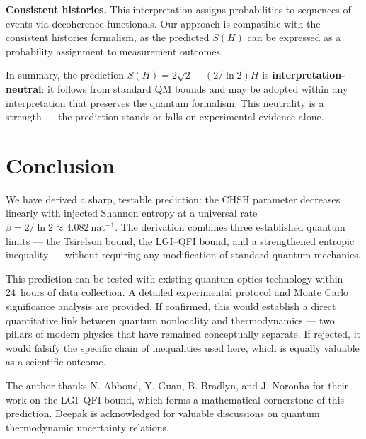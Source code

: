 \documentclass[a4paper]{quantumarticle}
\begin{document}
\textbf{Consistent histories.} This interpretation assigns probabilities to sequences of events via decoherence functionals. Our approach is compatible with the consistent histories formalism, as the predicted $S(H)$ can be expressed as a probability assignment to measurement outcomes.

In summary, the prediction $S(H) = 2\sqrt{2} - (2/\ln 2)H$ is \textbf{interpretation-neutral}: it follows from standard QM bounds and may be adopted within any interpretation that preserves the quantum formalism. This neutrality is a strength --- the prediction stands or falls on experimental evidence alone.

\section{Conclusion}

We have derived a sharp, testable prediction: the CHSH parameter decreases linearly with injected Shannon entropy at a universal rate $\beta = 2/\ln 2 \approx 4.082\ \text{nat}^{-1}$. The derivation combines three established quantum limits --- the Tsirelson bound, the LGI--QFI bound, and a strengthened entropic inequality --- without requiring any modification of standard quantum mechanics.

This prediction can be tested with existing quantum optics technology within 24~hours of data collection. A detailed experimental protocol and Monte Carlo significance analysis are provided. If confirmed, this would establish a direct quantitative link between quantum nonlocality and thermodynamics --- two pillars of modern physics that have remained conceptually separate. If rejected, it would falsify the specific chain of inequalities used here, which is equally valuable as a scientific outcome.

\begin{acknowledgements}
The author thanks N. Abboud, Y. Guan, B. Bradlyn, and J. Noronha for their work on the LGI--QFI bound, which forms a mathematical cornerstone of this prediction. Deepak is acknowledged for valuable discussions on quantum thermodynamic uncertainty relations.
\end{acknowledgements}



\end{document}
